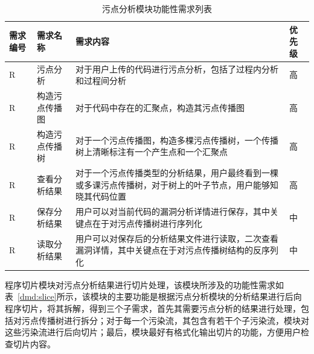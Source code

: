 \begin{table}[!htbp]\footnotesize %
	\centering
	\caption{污点分析模块功能性需求列表}
	\vspace{2mm}
	\begin{tabular}{L{1.3cm}L{2.5cm}L{6.8cm}L{1.5cm}}
		\toprule
		\textbf{需求编号}&\textbf{需求名称}&\textbf{需求内容}&\textbf{优先级}\\
		\midrule
		R	& 污点分析 				& 对于用户上传的代码进行污点分析，包括了过程内分析和过程间分析 & 高 \\
		R  & 构造污点传播图 	 & 对于代码中存在的汇聚点，构造其污点传播图 & 高 \\
		R  & 构造污点传播树	 & 对于一个污点传播图，构造多棵污点传播树，一个传播树上清晰标注有一个产生点和一个汇聚点 & 高 \\
		R  & 查看分析结果	 & 对于一个污点传播类型的分析结果，用户最终看到一棵或多课污点传播树，对于树上的叶子节点，用户能够知晓其代码位置 & 高 \\
		R  & 保存分析结果	   &用户可以对当前代码的漏洞分析详情进行保存，其中关键点在于对污点传播树进行序列化 & 中 \\
		R  & 读取分析结果 	   &用户可以对保存后的分析结果文件进行读取，二次查看漏洞详情，其中关键点在于对污点传播树结构的反序列化 & 中 \\
		\bottomrule
	\end{tabular}
	\label{dmd:taint}
\end{table}

程序切片模块对污点分析结果进行切片处理，该模块所涉及的功能性需求如表~\ref{dmd:slice}所示，该模块的主要功能是根据污点分析模块的分析结果进行后向程序切片，将其拆解，得到三个子需求，首先其需要污点分析的结果进行处理，包括对污点传播树进行拆分；对于每一个污染流，其包含有若干个子污染流，模块对这些污染流进行后向切片；最后，模块最好有格式化输出切片的功能，方便用户检查切片内容。


